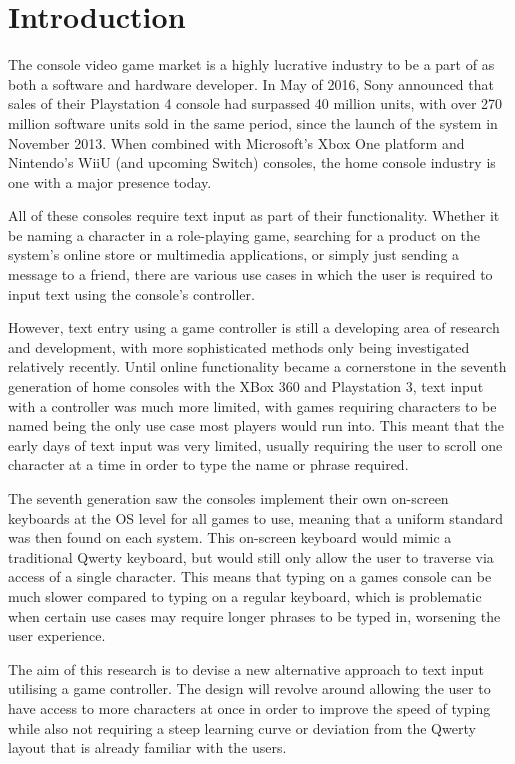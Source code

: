 \documentclass[requirements.tex]{subfiles}
\begin{document}
\section{Introduction} %
\label{sec:introduction}

The console video game market is a highly lucrative industry to be a part of as
both a software and hardware developer. In May of 2016, Sony announced that
sales of their Playstation 4 console had surpassed 40 million units, with over
270 million software units sold in the same period, since the launch of the
system in November 2013\cite{sony}. When combined with Microsoft's Xbox One
platform and Nintendo's WiiU (and upcoming Switch) consoles, the home console
industry is one with a major presence today.

All of these consoles require text input as part of their functionality. Whether
it be naming a character in a role-playing game, searching for a product on the
system's online store or multimedia applications, or simply just sending a
message to a friend, there are various use cases in which the user is required
to input text using the console's controller.

However, text entry using a game controller is still a developing area of
research and development, with more sophisticated methods only being
investigated relatively recently. Until online functionality became a
cornerstone in the seventh generation of home consoles with the XBox 360 and
Playstation 3, text input with a controller was much more limited, with games
requiring characters to be named being the only use case most players would
run into. This meant that the early days of text input was very limited, usually
requiring the user to scroll one character at a time in order to type the name
or phrase required.

The seventh generation saw the consoles implement their own on-screen keyboards
at the OS level for all games to use, meaning that a uniform standard was then
found on each system. This on-screen keyboard would mimic a traditional Qwerty
keyboard, but would still only allow the user to traverse via access of a single
character. This means that typing on a games console can be much slower compared
to typing on a regular keyboard, which is problematic when certain use cases may
require longer phrases to be typed in, worsening the user experience.

The aim of this research is to devise a new alternative approach to text input
utilising a game controller. The design will revolve around allowing the user
to have access to more characters at once in order to improve the speed of
typing while also not requiring a steep learning curve or deviation from the
Qwerty layout that is already familiar with the users.
\end{document}
